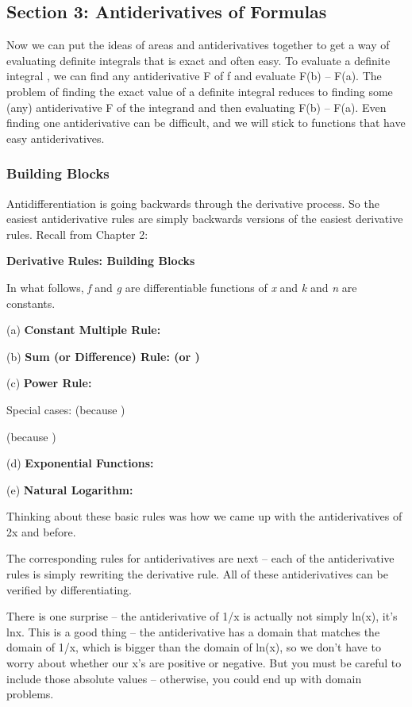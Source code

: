 \hypertarget{section-3-antiderivatives-of-formulas}{\subsection{Section
3: Antiderivatives of
Formulas}\label{section-3-antiderivatives-of-formulas}}

Now we can put the ideas of areas and antiderivatives together to get a
way of evaluating definite integrals that is exact and often easy. To
evaluate a definite integral , we can find any antiderivative F of f and
evaluate F(b) -- F(a). The problem of finding the exact value of a
definite integral reduces to finding some (any) antiderivative F of the
integrand and then evaluating F(b) -- F(a). Even finding one
antiderivative can be difficult, and we will stick to functions that
have easy antiderivatives.

\subsubsection{Building Blocks}\label{building-blocks-1}

Antidifferentiation is going backwards through the derivative process.
So the easiest antiderivative rules are simply backwards versions of the
easiest derivative rules. Recall from Chapter 2:

\textbf{Derivative Rules: Building Blocks}

In what follows, \emph{f} and \emph{g} are differentiable functions of
\emph{x} and \emph{k} and \emph{n} are constants.

(a) \textbf{Constant Multiple Rule:}

(b) \textbf{Sum (or Difference) Rule: (or )}

(c) \textbf{Power Rule: }

Special cases: (because )

(because )

(d) \textbf{Exponential Functions: }

(e) \textbf{Natural Logarithm:}

Thinking about these basic rules was how we came up with the
antiderivatives of 2x and before.

The corresponding rules for antiderivatives are next -- each of the
antiderivative rules is simply rewriting the derivative rule. All of
these antiderivatives can be verified by differentiating.

There is one surprise -- the antiderivative of 1/x is actually not
simply ln(x), it's ln\textbar{}x\textbar{}. This is a good thing -- the
antiderivative has a domain that matches the domain of 1/x, which is
bigger than the domain of ln(x), so we don't have to worry about whether
our x's are positive or negative. But you must be careful to include
those absolute values -- otherwise, you could end up with domain
problems.

